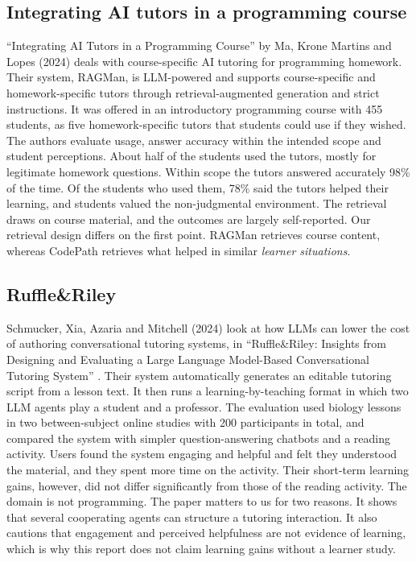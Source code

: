 \clearpage
\subsection{Integrating AI tutors in a programming course}
``Integrating AI Tutors in a Programming Course'' by Ma, Krone Martins and Lopes (2024) \cite{ma2024} deals with course-specific AI tutoring for programming homework. Their system, RAGMan, is LLM-powered and supports course-specific and homework-specific tutors through retrieval-augmented generation and strict instructions. It was offered in an introductory programming course with 455 students, as five homework-specific tutors that students could use if they wished. The authors evaluate usage, answer accuracy within the intended scope and student perceptions. About half of the students used the tutors, mostly for legitimate homework questions. Within scope the tutors answered accurately 98\% of the time. Of the students who used them, 78\% said the tutors helped their learning, and students valued the non-judgmental environment. The retrieval draws on course material, and the outcomes are largely self-reported. Our retrieval design differs on the first point. RAGMan retrieves course content, whereas CodePath retrieves what helped in similar \emph{learner situations}.

\subsection{Ruffle\&Riley}
Schmucker, Xia, Azaria and Mitchell (2024) look at how LLMs can lower the cost of authoring conversational tutoring systems, in ``Ruffle\&Riley: Insights from Designing and Evaluating a Large Language Model-Based Conversational Tutoring System'' \cite{schmucker2024}. Their system automatically generates an editable tutoring script from a lesson text. It then runs a learning-by-teaching format in which two LLM agents play a student and a professor. The evaluation used biology lessons in two between-subject online studies with 200 participants in total, and compared the system with simpler question-answering chatbots and a reading activity. Users found the system engaging and helpful and felt they understood the material, and they spent more time on the activity. Their short-term learning gains, however, did not differ significantly from those of the reading activity. The domain is not programming. The paper matters to us for two reasons. It shows that several cooperating agents can structure a tutoring interaction. It also cautions that engagement and perceived helpfulness are not evidence of learning, which is why this report does not claim learning gains without a learner study.

